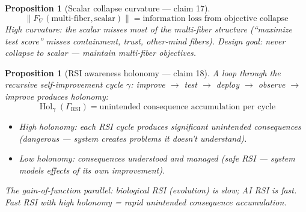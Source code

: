 \documentclass[11pt,a4paper]{article}
\newtheorem{proposition}[definition]{Proposition}
\begin{document}
\begin{proposition}[Scalar collapse curvature --- claim 17]
\label{prop:scalar_curv}
\[
  \|F_\nabla(\text{multi-fiber}, \text{scalar})\| = \text{information
    loss from objective collapse}
\]
High curvature: the scalar misses most of the multi-fiber structure
(``maximize test score'' misses containment, trust, other-mind fibers).
Design goal: never collapse to scalar --- maintain multi-fiber objectives.
\end{proposition}

\begin{proposition}[RSI awareness holonomy --- claim 18]
\label{prop:rsi_hol}
A loop through the recursive self-improvement cycle $\gamma$: improve
$\to$ test $\to$ deploy $\to$ observe $\to$ improve produces holonomy:
\[
  \operatorname{Hol}_\gamma(\Gamma_{\text{RSI}}) = \text{unintended
    consequence accumulation per cycle}
\]
\begin{itemize}
  \item High holonomy: each RSI cycle produces significant unintended
    consequences (dangerous --- system creates problems it doesn't
    understand).
  \item Low holonomy: consequences understood and managed (safe RSI ---
    system models effects of its own improvement).
\end{itemize}
The gain-of-function parallel: biological RSI (evolution) is slow;
AI RSI is fast. Fast RSI with high holonomy = rapid unintended
consequence accumulation.
\end{proposition}
\end{document}
